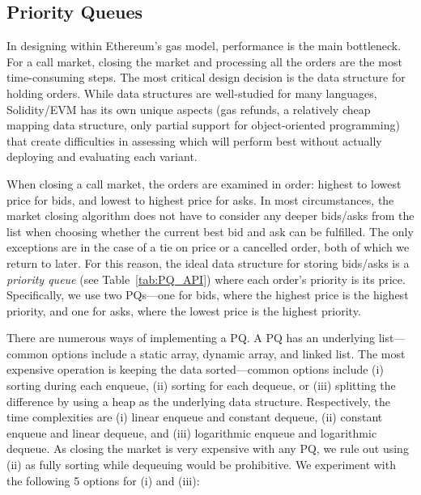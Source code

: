 





\subsection{Priority Queues}\label{sec:pq}



In designing \cm within Ethereum's gas model, performance is the main bottleneck. For a call market, closing the market and processing all the orders are the most time-consuming steps. The most critical design decision is the data structure for holding orders. While data structures are well-studied for many languages, Solidity/EVM has its own unique aspects (\eg gas refunds, a relatively cheap mapping data structure, only partial support for object-oriented programming) that create difficulties in assessing which will perform best without actually deploying and evaluating each variant.

When closing a call market, the orders are examined in order: highest to lowest price for bids, and lowest to highest price for asks. In most circumstances, the market closing algorithm does not have to consider any deeper bids/asks from the list when choosing whether the current best bid and ask can be fulfilled. The only exceptions are in the case of a tie on price or a cancelled order, both of which we return to later. For this reason, the ideal data structure for storing bids/asks is a \textit{priority queue} (see Table~\ref{tab:PQ_API}) where each order's priority is its price. Specifically, we use two PQs---one for bids, where the highest price is the highest priority, and one for asks, where the lowest price is the highest priority.

There are numerous ways of implementing a PQ. A PQ has an underlying list---common options include a static array, dynamic array, and linked list. The most expensive operation is keeping the data sorted---common options include (i) sorting during each enqueue, (ii) sorting for each dequeue, or (iii) splitting the difference by using a heap as the underlying data structure. Respectively, the time complexities are (i) linear enqueue and constant dequeue, (ii) constant enqueue and linear dequeue, and (iii) logarithmic enqueue and logarithmic dequeue. As closing the market is very expensive with any PQ, we rule out using (ii) as fully sorting while dequeuing would be prohibitive. We experiment with the following 5 options for (i) and (iii):

